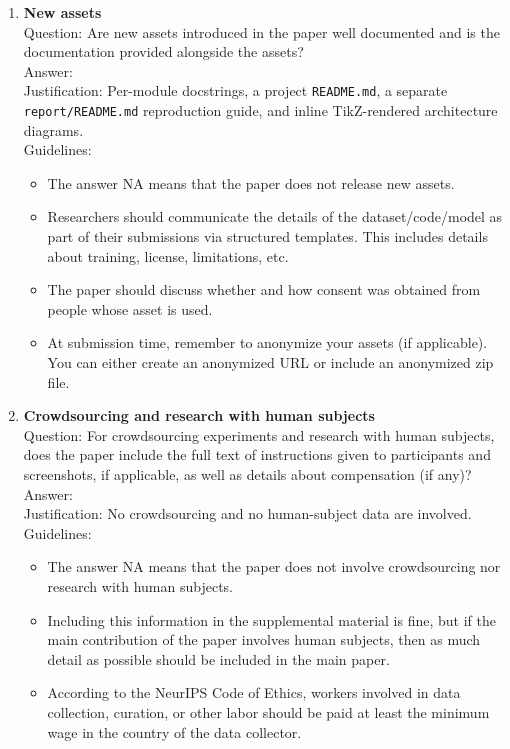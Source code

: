 \documentclass{article}
\begin{document}
\begin{enumerate}
\item {\bf New assets}\\
Question: Are new assets introduced in the paper well documented and is the documentation provided alongside the assets?\\
Answer: \answerYes{}\\
Justification: Per-module docstrings, a project \texttt{README.md}, a separate \texttt{report/README.md} reproduction guide, and inline TikZ-rendered architecture diagrams.\\
Guidelines:
\begin{itemize}
\item The answer NA means that the paper does not release new assets.
\item Researchers should communicate the details of the dataset/code/model as part of their submissions via structured templates. This includes details about training, license, limitations, etc.
\item The paper should discuss whether and how consent was obtained from people whose asset is used.
\item At submission time, remember to anonymize your assets (if applicable). You can either create an anonymized URL or include an anonymized zip file.
\end{itemize}

\item {\bf Crowdsourcing and research with human subjects}\\
Question: For crowdsourcing experiments and research with human subjects, does the paper include the full text of instructions given to participants and screenshots, if applicable, as well as details about compensation (if any)?\\
Answer: \answerNA{}\\
Justification: No crowdsourcing and no human-subject data are involved.\\
Guidelines:
\begin{itemize}
\item The answer NA means that the paper does not involve crowdsourcing nor research with human subjects.
\item Including this information in the supplemental material is fine, but if the main contribution of the paper involves human subjects, then as much detail as possible should be included in the main paper.
\item According to the NeurIPS Code of Ethics, workers involved in data collection, curation, or other labor should be paid at least the minimum wage in the country of the data collector.
\end{itemize}


\end{enumerate}
\end{document}
